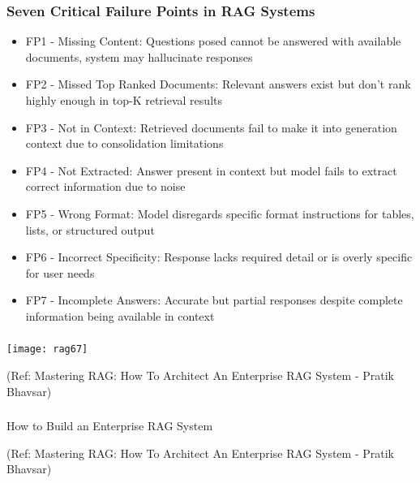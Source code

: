 \begin{frame}[fragile]\frametitle{Seven Critical Failure Points in RAG Systems}
      \begin{itemize}
        \item FP1 - Missing Content: Questions posed cannot be answered with available documents, system may hallucinate responses
        \item FP2 - Missed Top Ranked Documents: Relevant answers exist but don't rank highly enough in top-K retrieval results
        \item FP3 - Not in Context: Retrieved documents fail to make it into generation context due to consolidation limitations
        \item FP4 - Not Extracted: Answer present in context but model fails to extract correct information due to noise
        \item FP5 - Wrong Format: Model disregards specific format instructions for tables, lists, or structured output
        \item FP6 - Incorrect Specificity: Response lacks required detail or is overly specific for user needs
        \item FP7 - Incomplete Answers: Accurate but partial responses despite complete information being available in context
      \end{itemize}
\end{frame}

\begin{frame}[fragile]\frametitle{}

	\begin{center}
	\texttt{[image: rag67]}
	
	{\tiny (Ref: Mastering RAG: How To Architect An Enterprise RAG System - Pratik Bhavsar)}
	
	\end{center}
	
	
\end{frame}

\begin{frame}[fragile]\frametitle{}
\begin{center}
{\Large How to Build an Enterprise RAG System}

{\tiny (Ref: Mastering RAG: How To Architect An Enterprise RAG System - Pratik Bhavsar)}

\end{center}
\end{frame}


